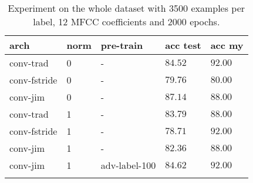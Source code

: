 \begin{table}[ht!]
\small
\begin{center}
\caption{Experiment on the whole dataset with 3500 examples per label, 12 MFCC coefficients and 2000 epochs.}
\begin{tabular}{ M{3cm}  M{1cm}  M{2.5cm}  M{2.5cm}  M{2.5cm} }
\toprule
\textbf{arch} & \textbf{norm} & \textbf{pre-train} & \textbf{acc test} & \textbf{acc my} \\
\midrule
conv-trad & 0 & - & $84.52$ & $92.00$ \\
conv-fstride & 0 & - & $79.76$ & $80.00$ \\
conv-jim & 0 & - & $87.14$ & $88.00$ \\
\midrule
conv-trad & 1 & - & $83.79$ & $88.00$ \\
conv-fstride & 1 & - & $78.71$ & $92.00$ \\
conv-jim & 1 & - & $82.36$ & $88.00$ \\
\midrule
conv-jim & 1 & adv-label-100 & $84.62$ & $92.00$ \\
\bottomrule
\label{tab:exp_final_l12}
\end{tabular}
\end{center}
\vspace{-4mm}
\end{table}
\FloatBarrier
\noindent